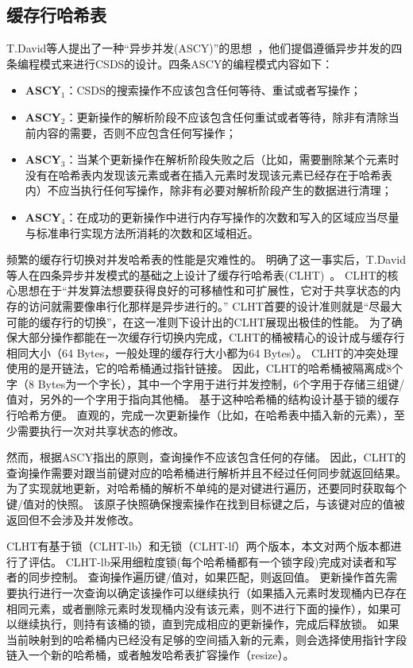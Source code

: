 \subsection{缓存行哈希表}
\label{sec:clht}

T.David等人提出了一种“异步并发(ASCY)”的思想~\cite{clht}，他们提倡遵循异步并发的四条编程模式来进行CSDS的设计。四条ASCY的编程模式内容如下：
\begin{itemize}
\item \textbf{ASCY$_1$}：CSDS的搜索操作不应该包含任何等待、重试或者写操作；
\item \textbf{ASCY$_2$}：更新操作的解析阶段不应该包含任何重试或者等待，除非有清除当前内容的需要，否则不应包含任何写操作；
\item \textbf{ASCY$_3$}：当某个更新操作在解析阶段失败之后（比如，需要删除某个元素时没有在哈希表内发现该元素或者在插入元素时发现该元素已经存在于哈希表内）不应当执行任何写操作，除非有必要对解析阶段产生的数据进行清理；
\item \textbf{ASCY$_4$}：在成功的更新操作中进行内存写操作的次数和写入的区域应当尽量与标准串行实现方法所消耗的次数和区域相近。
\end{itemize}

频繁的缓存行切换对并发哈希表的性能是灾难性的。
明确了这一事实后，T.David等人在四条异步并发模式的基础之上设计了缓存行哈希表(CLHT)~\cite{clht}。
CLHT的核心思想在于“并发算法想要获得良好的可移植性和可扩展性，它对于共享状态的内存的访问就需要像串行化那样是异步进行的。”
CLHT首要的设计准则就是“尽最大可能的缓存行的切换”，在这一准则下设计出的CLHT展现出极佳的性能。
为了确保大部分操作都能在一次缓存行切换内完成，CLHT的桶被精心的设计成与缓存行相同大小（64 Bytes，一般处理的缓存行大小都为64 Bytes）。
CLHT的冲突处理使用的是开链法，它的哈希桶通过指针链接。
因此，CLHT的哈希桶被隔离成8个字（8 Bytes为一个字长），其中一个字用于进行并发控制，6个字用于存储三组键/值对，另外的一个字用于指向其他桶。
基于这种哈希桶的结构设计基于锁的缓存行哈希方便。
直观的，完成一次更新操作（比如，在哈希表中插入新的元素），至少需要执行一次对共享状态的修改。

然而，根据ASCY指出的原则，查询操作不应该包含任何的存储。
因此，CLHT的查询操作需要对跟当前键对应的哈希桶进行解析并且不经过任何同步就返回结果。
为了实现就地更新，对哈希桶的解析不单纯的是对键进行遍历，还要同时获取每个键/值对的快照。
该原子快照确保搜索操作在找到目标键之后，与该键对应的值被返回但不会涉及并发修改。

CLHT有基于锁（CLHT-lb）和无锁（CLHT-lf）两个版本，本文对两个版本都进行了评估。
CLHT-lb采用细粒度锁(每个哈希桶都有一个锁字段)完成对读者和写者的同步控制。
查询操作遍历键/值对，如果匹配，则返回值。
更新操作首先需要执行进行一次查询以确定该操作可以继续执行（如果插入元素时发现桶内已存在相同元素，或者删除元素时发现桶内没有该元素，则不进行下面的操作），如果可以继续执行，则持有该桶的锁，直到完成相应的更新操作，完成后释放锁。
如果当前映射到的哈希桶内已经没有足够的空间插入新的元素，则会选择使用指针字段链入一个新的哈希桶，或者触发哈希表扩容操作（resize）。

